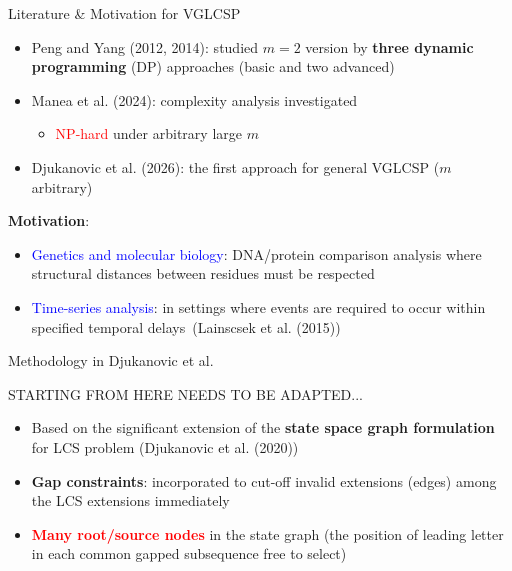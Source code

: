 \documentclass{beamer}
\begin{document}
\begin{frame}{Literature \& Motivation for VGLCSP}
   
   \begin{itemize}
       \item  Peng and Yang (2012, 2014): studied  $m=2$  version by \textbf{three dynamic programming} (DP) approaches (basic and two advanced)
       \item  Manea et al. (2024): complexity analysis investigated
       \begin{itemize}
       	\item   \textcolor{red}{NP-hard}  under arbitrary large $m$ 
        \end{itemize} 
        \item Djukanovic et al. (2026): the first approach for general VGLCSP ($m$ arbitrary)
   \end{itemize} \vspace{0.5cm}
   
   \textbf{Motivation}:
   \begin{itemize}
       \item  \textcolor{blue}{Genetics and molecular biology}: DNA/protein comparison analysis where structural distances between residues must be respected \vspace{0.2cm}
       \item \textcolor{blue}{Time-series analysis}: in settings where events are required to occur within specified temporal delays~(Lainscsek et al. (2015))

   \end{itemize}
   
\end{frame}

\begin{frame}{Methodology in Djukanovic et al. }
	
	STARTING FROM HERE NEEDS TO BE ADAPTED...
	
    \begin{itemize}
        \item Based on the significant extension of the \textbf{state space graph formulation} for LCS problem  (Djukanovic et al. (2020)) \vspace{0.3cm}
        \item \textbf{Gap constraints}: incorporated to cut-off invalid extensions (edges) among the LCS extensions immediately \vspace{0.3cm}
        \item \textcolor{red}{\textbf{Many root/source nodes}} in the state graph (the position of leading letter in each common gapped subsequence free to select)
    \end{itemize}
    
\end{frame}
\end{document}
